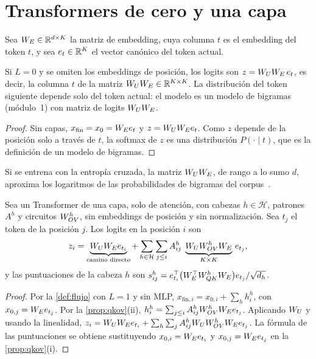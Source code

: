 \section{Transformers de cero y una capa}

Sea $W_{E}\in\mathbb{R}^{d\times K}$ la matriz de embedding, cuya columna $t$ es el embedding del token $t$, y sea $e_t\in\mathbb{R}^{K}$ el vector canónico del token actual.

\begin{proposicion}\label{prop:cero}
Si $L=0$ y se omiten los embeddings de posición, los logits son $z=W_{U}W_{E}\,e_t$, es decir, la columna $t$ de la matriz $W_{U}W_{E}\in\mathbb{R}^{K\times K}$. La distribución del token siguiente depende solo del token actual: el modelo es un modelo de bigramas (módulo~1) con matriz de logits $W_{U}W_{E}$.
\end{proposicion}

\begin{proof}
Sin capas, $x_{\mathrm{fin}}=x_0=W_{E} e_t$ y $z=W_{U}W_{E} e_t$. Como $z$ depende de la posición solo a través de $t$, la softmax de $z$ es una distribución $P(\cdot\mid t)$, que es la definición de un modelo de bigramas.
\end{proof}

Si se entrena con la entropía cruzada, la matriz $W_{U}W_{E}$, de rango a lo sumo $d$, aproxima los logaritmos de las probabilidades de bigramas del corpus~\cite[«Zero-Layer Transformers»]{elhage21}.

\begin{teorema}\label{teo:caminos}
Sea un Transformer de una capa, solo de atención, con cabezas $h\in\mathcal{H}$, patrones $A^{h}$ y circuitos $W_{OV}^{h}$, sin embeddings de posición y sin normalización. Sea $t_j$ el token de la posición $j$. Los logits en la posición $i$ son
\[
z_i=\underbrace{W_{U}W_{E} e_{t_i}}_{\text{camino directo}}+\sum_{h\in\mathcal{H}}\sum_{j\le i}A^{h}_{ij}\;\underbrace{W_{U}W_{OV}^{h}W_{E}}_{K\times K}\,e_{t_j},
\]
y las puntuaciones de la cabeza $h$ son $s^{h}_{ij}=e_{t_i}^{\top}\bigl(W_{E}^{\top}W_{QK}^{h}W_{E}\bigr)e_{t_j}/\sqrt{d_h}$.
\end{teorema}

\begin{proof}
Por la \cref{def:flujo} con $L=1$ y sin MLP, $x_{\mathrm{fin},i}=x_{0,i}+\sum_hh^{h}_i$, con $x_{0,j}=W_{E} e_{t_j}$. Por la \cref{prop:qkov}(ii), $h^{h}_i=\sum_{j\le i}A^{h}_{ij}W_{OV}^{h}W_{E} e_{t_j}$. Aplicando $W_{U}$ y usando la linealidad, $z_i=W_{U}W_{E} e_{t_i}+\sum_h\sum_jA^{h}_{ij}W_{U}W_{OV}^{h}W_{E} e_{t_j}$. La fórmula de las puntuaciones se obtiene sustituyendo $x_{0,i}=W_{E} e_{t_i}$ y $x_{0,j}=W_{E} e_{t_j}$ en la \cref{prop:qkov}(i).
\end{proof}


